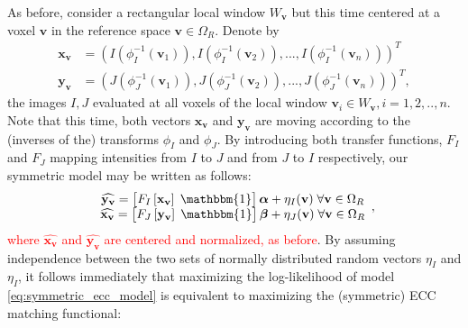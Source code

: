 
As before, consider a rectangular local window $W_{\mathbf{v}}$ but this time centered at a voxel $\mathbf{v}$ in the reference space $\mathbf{v}\in\Omega_{R}$. Denote by
\begin{align*}
    \mathbf{x}_{\mathbf{v}} &= \left(I(\phi_{I}^{-1}(\mathbf{v}_{1})), I(\phi_{I}^{-1}(\mathbf{v}_{2})), ..., I(\phi_{I}^{-1}(\mathbf{v}_{n}))\right)^{T}\\
    \mathbf{y}_{\mathbf{v}} &= \left(J(\phi_{J}^{-1}(\mathbf{v}_{1})), J(\phi_{J}^{-1}(\mathbf{v}_{2})), ..., J(\phi_{J}^{-1}(\mathbf{v}_{n}))\right)^{T},
\end{align*}
the images $I, J$ evaluated at all voxels of the local window $\mathbf{v}_{i}\in W_{\mathbf{v}}, i=1, 2, .., n$. Note that this time, both vectors $\mathbf{x}_{\mathbf{v}}$ and $\mathbf{y}_{\mathbf{v}}$ are moving according to the (inverses of the) transforms $\phi_{I}$ and $\phi_{J}$. By introducing both transfer functions, $F_{I}$ and $F_{J}$ mapping intensities from $I$ to $J$ and from $J$ to $I$ respectively, our symmetric model may be written as follows:
\begin{equation}\label{eq:symmetric_ecc_model}
    \begin{array}{ccccc}
        \widehat{\mathbf{y_v}} = \left[F_{I}\left[\mathbf{x}_{\mathbf{v}}\right] \; \mathbbm{1}\right]\boldsymbol{\alpha} + \eta_{I}(\mathbf{v}) \; \forall \mathbf{v}\in\Omega_{R}\\
        \widehat{\mathbf{x_v}} = \left[F_{J}\left[\mathbf{y}_{\mathbf{v}}\right] \; \mathbbm{1}\right]\boldsymbol{\beta} + \eta_{J}(\mathbf{v}) \; \forall \mathbf{v}\in\Omega_{R}\\
    \end{array},
\end{equation}
\textcolor{red}{where $\widehat{\mathbf{x_v}}$ and $\widehat{\mathbf{y_v}}$ are centered and normalized, as before}. By assuming independence between the two sets of normally distributed random vectors $\eta_{I}$ and $\eta_{I}$, it follows immediately that maximizing the log-likelihood of model \eqref{eq:symmetric_ecc_model} is equivalent to maximizing the (symmetric) ECC matching functional:
